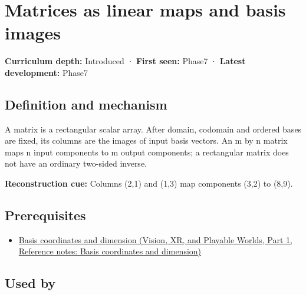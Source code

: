 \hypertarget{appendix-bd39c3bf5d64}{}\label{referencestart:appendix-bd39c3bf5d64}
\section{Matrices as linear maps and basis images}\label{appendix-bd39c3bf5d64-matrices-as-linear-maps-and-basis-images}

\hypertarget{appendix-bd39c3bf5d64-matrices-as-linear-maps-and-basis-images}{}

\textbf{Curriculum depth:} Introduced · \textbf{First seen:} Phase7 · \textbf{Latest development:} Phase7

\begin{allmightroledefinition}

\subsection{Definition and mechanism}\label{appendix-bd39c3bf5d64-definition-and-mechanism}

\hypertarget{appendix-bd39c3bf5d64-definition-and-mechanism}{}

A matrix is a rectangular scalar array. After domain, codomain and ordered bases are fixed, its columns are the images of input basis vectors. An m by n matrix maps n input components to m output components; a rectangular matrix does not have an ordinary two-sided inverse.

\end{allmightroledefinition}

\textbf{Reconstruction cue:} Columns (2,1) and (1,3) map components (3,2) to (8,9).

\subsection{Prerequisites}\label{appendix-bd39c3bf5d64-prerequisites}

\hypertarget{appendix-bd39c3bf5d64-prerequisites}{}

\begin{itemize}
\tightlist
\item
  \href{../07-Vision-XR-and-Playable-Worlds-P01/main.pdf\#appendix-ce0341f7ea0d}{Basis coordinates and dimension (Vision, XR, and Playable Worlds, Part 1, Reference notes: Basis coordinates and dimension)}
\end{itemize}

\subsection{Used by}\label{appendix-bd39c3bf5d64-used-by}

